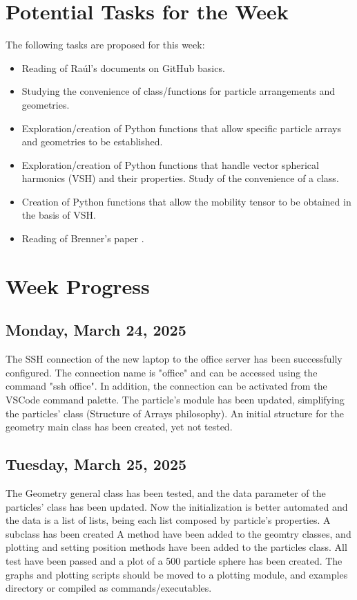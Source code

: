 \documentclass[12pt]{article}
\begin{document}
\section{Potential Tasks for the Week}
The following tasks are proposed for this week:
\begin{itemize}
    \item Reading of Raúl's documents on GitHub basics.
    \item Studying the convenience of class/functions for particle arrangements and geometries.
    \item Exploration/creation of Python functions that allow specific particle arrays and geometries to be established.
    \item Exploration/creation of Python functions that handle vector spherical harmonics (VSH) and their properties. Study of the convenience of a class.
    \item Creation of Python functions that allow the mobility tensor to be obtained in the basis of VSH.
    \item Reading of Brenner's paper \cite{BRENNER1961242}.
\end{itemize}

\section{Week Progress}

\subsection{Monday, March 24, 2025}
The SSH connection of the new laptop to the office server
has been successfully configured. The connection name is
"office" and can be accessed using the command "ssh office".
In addition, the connection can be activated from the VSCode
command palette. The particle's module has been updated,
simplifying the particles' class (Structure of Arrays philosophy).
An initial structure for the geometry main class has been created,
yet not tested.

\subsection{Tuesday, March 25, 2025}
The Geometry general class has been tested, and the 
data parameter of the particles' class has been updated.
Now the initialization is better automated and the data
is a list of lists, being each list composed by particle's
properties. A  subclass has been created
A  method have been added to the geomtry
classes, and plotting and setting position methods have been
added to the particles class. All test have been passed and a
plot of a 500 particle sphere has been created. The graphs and
plotting scripts should be moved to a plotting module, and
examples directory or compiled as commands/executables.
\end{document}
